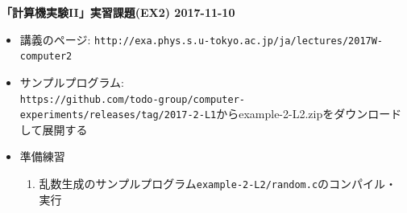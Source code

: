 \documentclass[11pt]{jarticle}
\begin{document}
\noindent
{\bf\large 「計算機実験II」実習課題(EX2) 2017-11-10}
\\[-0.5em]

\noindent
\begin{itemize}
\item 講義のページ: \verb+http://exa.phys.s.u-tokyo.ac.jp/ja/lectures/2017W-computer2+

\item サンプルプログラム: \\ {\small \verb+https://github.com/todo-group/computer-experiments/releases/tag/2017-2-L1+}からexample-2-L2.zipをダウンロードして展開する

\item 準備練習
  
  \begin{enumerate}
  \item 乱数生成のサンプルプログラム{\tt example-2-L2/random.c}のコンパイル・実行
  \end{enumerate}


\end{itemize}
\end{document}
